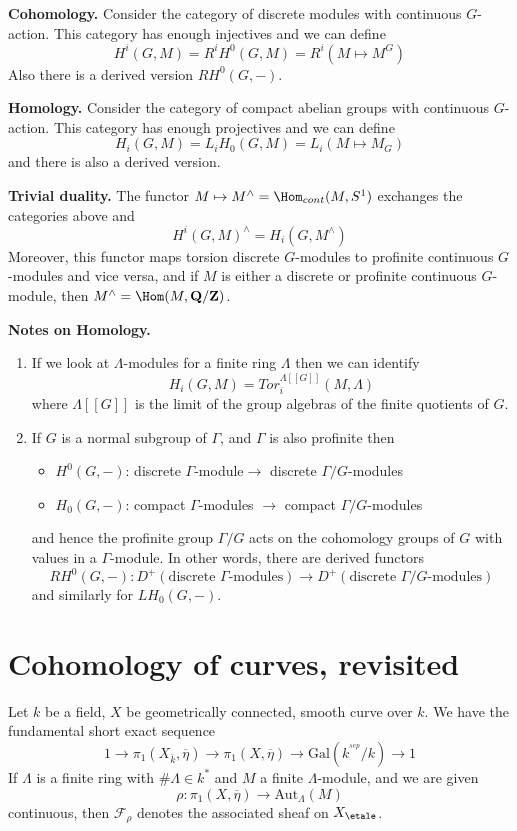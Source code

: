 \medskip\noindent
{\bf Cohomology.}
Consider the category of discrete modules with continuous $G$-action.
This category has enough injectives and we can define
$$
H^i(G, M) = R^iH^0(G, M) = R^i(M\mapsto M^G)
$$
Also there is a derived version $RH^0(G, -)$.

\medskip\noindent
{\bf Homology.}
Consider the category of compact abelian groups with continuous $G$-action.
This category has enough projectives and we can define
$$
H_i(G, M) = L_iH_0(G, M)=L_i(M\mapsto M_G)
$$
and there is also a derived version.

\medskip\noindent
{\bf Trivial duality.}
The functor $M\mapsto M^\wedge = \Hom_{cont}(M, S^1)$
exchanges the categories above and
$$
H^i(G, M)^\wedge = H_i(G, M^\wedge)
$$
Moreover, this functor maps torsion discrete $G$-modules to profinite
continuous $G$-modules and vice versa, and if $M$ is either a discrete or
profinite continuous $G$-module, then
$M^\wedge = \Hom(M, \mathbf{Q}/\mathbf{Z})$.

\medskip\noindent
{\bf Notes on Homology.}
\begin{enumerate}
\item If we look at $\Lambda$-modules for a finite ring $\Lambda$
then we can identify
$$
H_i(G, M)=Tor_i^{\Lambda[[G]]}(M, \Lambda)
$$
where $\Lambda[[G]]$ is the limit of the group algebras of the finite
quotients of $G$.
\item If $G$ is a normal subgroup of $\Gamma$, and $\Gamma$ is also
profinite then
\begin{itemize}
\item $H^0(G, -)$: discrete $\Gamma$-module$\to$ discrete
$\Gamma/G$-modules
\item $H_0(G, -)$: compact $\Gamma$-modules $\to$ compact
$\Gamma/G$-modules
\end{itemize}
and hence the profinite group $\Gamma/G$ acts on the cohomology groups
of $G$ with values in a $\Gamma$-module. In other words, there are derived
functors
$$
RH^0(G, -) :
D^{+}(\text{discrete }\Gamma\text{-modules})
\longrightarrow
D^{+}(\text{discrete }\Gamma/G\text{-modules})
$$
and similarly for $LH_0(G, -)$.
\end{enumerate}

\section{Cohomology of curves, revisited}
\label{trace-section-cohomology-curves-revisited}
Let $k$ be a field, $X$ be geometrically connected, smooth curve over $k$.
We have the fundamental short exact sequence
$$
1 \to
\pi_1(X_{\overline{k}}, \overline \eta) \to
\pi_1(X, \overline\eta) \to
\text{Gal}(k^{^{sep}}/k) \to 1
$$
If $\Lambda$ is a finite ring with $\#\Lambda\in k^*$ and $M$ a finite
$\Lambda$-module, and we are given
$$
\rho : \pi_1(X, \overline\eta) \to \text{Aut}_{\Lambda}(M)
$$
continuous, then $\mathcal{F}_\rho$ denotes the associated sheaf on
$X_\etale$.

